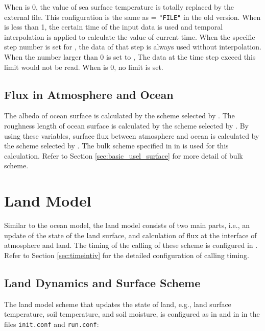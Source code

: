 When  is 0, the value of sea surface temperature is totally replaced by the external file. This configuration is the same as  = \verb|"FILE"| in the old version.
%
When  is less than 1, the certain time of the input data is used and temporal interpolation is applied to calculate the value of current time. When the specific step number is set for , the data of that step is always used without interpolation.
%
When the number larger than 0 is set to , The data at the time step exceed this limit would not be read. When  is 0, no limit is set.

\subsection{Flux in Atmosphere and Ocean}
The albedo of ocean surface is calculated by the scheme selected by . The roughness length of ocean surface is calculated by the scheme selected by . By using these variables, surface flux between atmosphere and ocean is calculated by the scheme selected by . The bulk scheme specified in  in  is used for this calculation. Refer to Section \ref{sec:basic_usel_surface} for more detail of bulk scheme.



\section{Land Model} \label{sec:basic_usel_land}
Similar to the ocean model, the land model consists of two main parts, i.e., an update of the state of the land surface, and calculation of flux at the interface of atmosphere and land. The timing of the calling of these scheme is configured in . Refer to Section \ref{sec:timeintiv} for the detailed configuration of calling timing.

\subsection{Land Dynamics and Surface Scheme}
The land model scheme that updates the state of land, e.g., land surface temperature, soil temperature, and soil moisture, is configured as in  and  in  in the files \verb|init.conf| and \verb|run.conf|:

